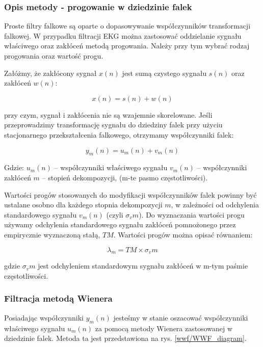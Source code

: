 \documentclass[a4paper]{article}
\begin{document}
\subsubsection{Opis metody - progowanie w dziedzinie falek}

Proste filtry falkowe są oparte o dopasowywanie współczynników transformacji falkowej. W przypadku filtracji EKG można zastosować oddzielanie sygnału właściwego oraz zakłóceń metodą progowania. Należy przy tym wybrać rodzaj progowania oraz wartość progu. 

Załóżmy, że zakłócony sygnał $x(n)$ jest sumą czystego sygnału $s(n)$ oraz zakłóceń $w(n)$:

\begin{equation} 
x(n) = s(n)+w(n)
\end{equation}

przy czym, sygnał i zakłócenia nie są wzajemnie skorelowane. Jeśli przeprowadzimy transformację sygnału do dziedziny falek przy użyciu stacjonarnego przekształcenia falkowego, otrzymamy współczynniki falek:

\begin{equation} 
y_m (n)=u_m (n)+v_m (n)
\end{equation}

Gdzie: 
$u_m(n)$ – współczynniki właściwego sygnału
$v_m (n)$ – współczynniki zakłóceń
$m$ – stopień dekompozycji, (m-te pasmo częstotliwości).

Wartości progów stosowanych do modyfikacji współczynników falek powinny być ustalane osobno dla każdego stopnia dekompozycji $m$, w zależności od odchylenia standardowego sygnału $v_m (n)$ (czyli $\sigma_vm$). Do wyznaczania wartości progu używamy odchylenia standardowego sygnału zakłóceń pomnożonego przez empirycznie wyznaczoną stałą, $TM$. Wartości progów można opisać równaniem:

\begin{equation} 
\lambda_m = TM \times \sigma_vm
\end{equation}

gdzie $\sigma_vm$ jest odchyleniem standardowym sygnału zakłóceń w m-tym paśmie częstotliwości.

\subsubsection{Filtracja metodą Wienera}

Posiadając współczynniki $y_m (n)$ jesteśmy w stanie oszacować współczynniki właściwego sygnału $u_m (n)$ za pomocą metody Wienera zastosowanej w dziedzinie falek. Metoda ta jest przedstawiona na rys. \ref{wwf/WWF_diagram}.
\end{document}
